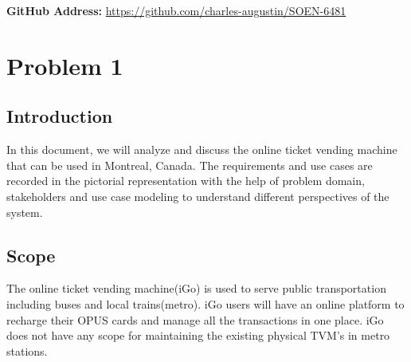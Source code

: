 \documentclass[a4paper, 11pt]{report}
\begin{document}
\begin{titlepage}
	
	
	
	\vfill\vfill\vfill\vfill%
	\textbf{GitHub Address:} \url{https://github.com/charles-augustin/SOEN-6481}

	
	 
	
	\vfill %
	
\end{titlepage}



 
\tableofcontents
\chapter{Problem 1}
\section{Introduction}
In this document, we will analyze and discuss the online ticket vending machine that can be used in Montreal, Canada. The requirements and use cases are recorded in the pictorial representation with the help of problem domain, stakeholders and use case modeling to understand different perspectives of the system.
\section{Scope}
The online ticket vending machine(iGo) is used to serve public transportation including buses and local trains(metro). iGo users will have an online platform to recharge their OPUS cards and manage all the transactions in one place. iGo does not have any scope for maintaining the existing physical TVM's in metro stations.
\end{document}
